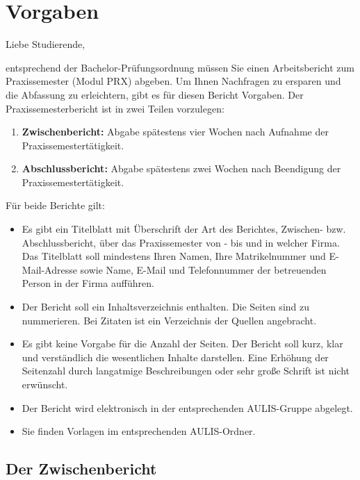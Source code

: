\documentclass[
  letterpaper,
  DIV=11]{scrartcl}
\begin{document}
\section{Vorgaben}\label{vorgaben}

Liebe Studierende,

entsprechend der Bachelor-Prüfungsordnung müssen Sie einen
Arbeitsbericht zum Praxissemester (Modul PRX) abgeben. Um Ihnen
Nachfragen zu ersparen und die Abfassung zu erleichtern, gibt es für
diesen Bericht Vorgaben. Der Praxissemesterbericht ist in zwei Teilen
vorzulegen:

\begin{enumerate}
\def\labelenumi{\arabic{enumi}.}
\item
  \textbf{Zwischenbericht:} Abgabe spätestens vier Wochen nach Aufnahme
  der Praxissemestertätigkeit.
\item
  \textbf{Abschlussbericht:} Abgabe spätestens zwei Wochen nach
  Beendigung der Praxissemestertätigkeit.
\end{enumerate}

Für beide Berichte gilt:

\begin{itemize}
\item
  Es gibt ein Titelblatt mit Überschrift der Art des Berichtes,
  Zwischen- bzw. Abschlussbericht, über das Praxissemester von - bis und
  in welcher Firma. Das Titelblatt soll mindestens Ihren Namen, Ihre
  Matrikelnummer und E-Mail-Adresse sowie Name, E-Mail und Telefonnummer
  der betreuenden Person in der Firma aufführen.
\item
  Der Bericht soll ein Inhaltsverzeichnis enthalten. Die Seiten sind zu
  nummerieren. Bei Zitaten ist ein Verzeichnis der Quellen angebracht.
\item
  Es gibt keine Vorgabe für die Anzahl der Seiten. Der Bericht soll
  kurz, klar und verständlich die wesentlichen Inhalte darstellen. Eine
  Erhöhung der Seitenzahl durch langatmige Beschreibungen oder sehr
  große Schrift ist nicht erwünscht.
\item
  Der Bericht wird elektronisch in der entsprechenden AULIS-Gruppe
  abgelegt.
\item
  Sie finden Vorlagen im entsprechenden AULIS-Ordner.
\end{itemize}

\subsection{Der Zwischenbericht}\label{der-zwischenbericht}
\end{document}

